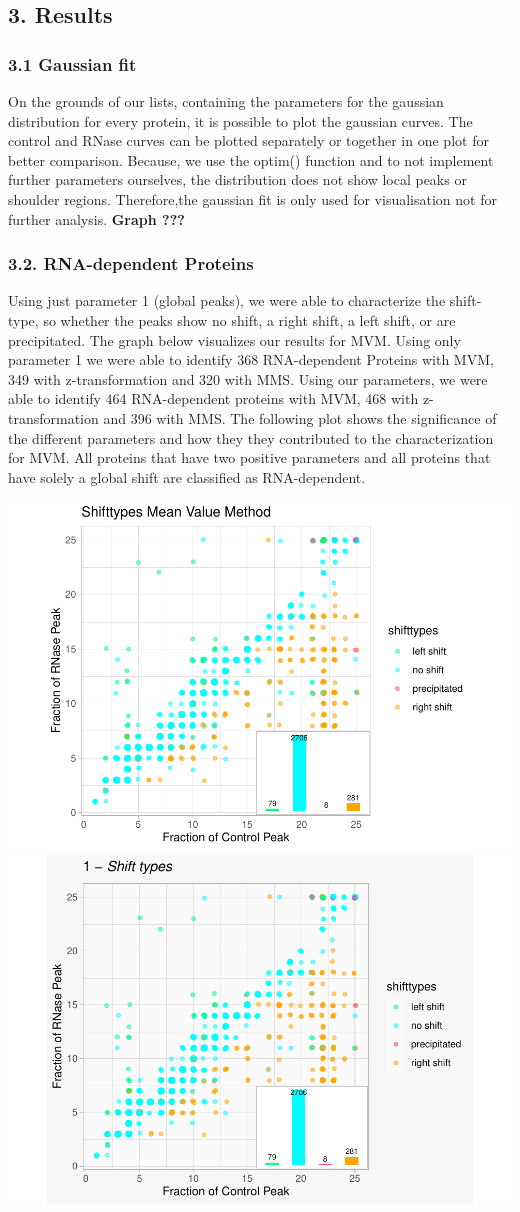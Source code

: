 \documentclass[
  12pt,
]{article}
\begin{document}
\hypertarget{results}{%
\subsection{3. Results}\label{results}}

\hypertarget{gaussian-fit-1}{%
\subsubsection{3.1 Gaussian fit}\label{gaussian-fit-1}}

On the grounds of our lists, containing the parameters for the gaussian
distribution for every protein, it is possible to plot the gaussian
curves. The control and RNase curves can be plotted separately or
together in one plot for better comparison. Because, we use the optim()
function and to not implement further parameters ourselves, the
distribution does not show local peaks or shoulder regions.
Therefore,the gaussian fit is only used for visualisation not for
further analysis. \textbf{Graph ???}

\hypertarget{rna-dependent-proteins}{%
\subsubsection{3.2. RNA-dependent
Proteins}\label{rna-dependent-proteins}}

Using just parameter 1 (global peaks), we were able to characterize the
shift-type, so whether the peaks show no shift, a right shift, a left
shift, or are precipitated. The graph below visualizes our results for
MVM. Using only parameter 1 we were able to identify 368 RNA-dependent
Proteins with MVM, 349 with z-transformation and 320 with MMS. Using our
parameters, we were able to identify 464 RNA-dependent proteins with
MVM, 468 with z-transformation and 396 with MMS. The following plot
shows the significance of the different parameters and how they they
contributed to the characterization for MVM. All proteins that have two
positive parameters and all proteins that have solely a global shift are
classified as RNA-dependent.

\includegraphics[width=0.5\linewidth]{final_files/figure-latex/unnamed-chunk-3-1}
\includegraphics[width=0.5\linewidth]{final_files/figure-latex/unnamed-chunk-3-2}
\end{document}
